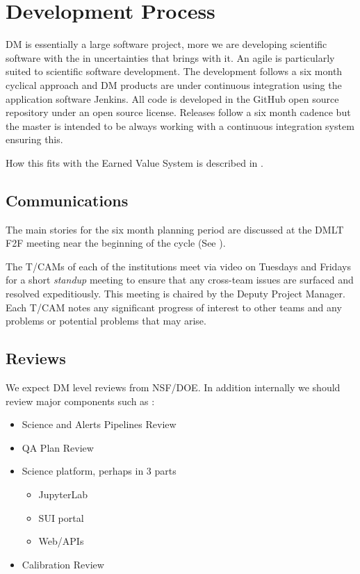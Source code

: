 \section{Development Process} \label{sect:devproc}

DM is essentially a large software project, more we are developing scientific software with the in uncertainties that brings with it. 
An agile \citep{it:agile} is particularly suited to scientific software development.  The development follows a six month  cyclical approach and  DM  products are under continuous
integration using the application software Jenkins. All code is developed in the GitHub open source repository under an open source license.
Releases follow a six month cadence but the master is intended to be always working with a continuous integration system ensuring this.

How this fits with the Earned Value System is described in .


\subsection{Communications}

The main stories for the six month planning period are discussed at the DMLT F2F meeting near the beginning of the cycle (See ). 

The T/CAMs of each of the institutions meet via video on Tuesdays and Fridays for a short \emph{standup} meeting to ensure that any cross-team issues are surfaced and resolved expeditiously.
This meeting is chaired by the Deputy Project Manager.
Each T/CAM notes any significant progress of interest to other teams and any problems or potential problems that may arise.

\subsection{Reviews} \label{sect:reviews}
We expect DM level reviews from NSF/DOE. In addition internally we should review major components such as :
\begin{itemize}

\item  Science and Alerts Pipelines Review 
\item   QA Plan Review 
  \item  Science platform, perhaps in 3 parts
	\begin{itemize}
	  \item  JupyterLab 
	  \item SUI portal
	  \item Web/APIs
	\end{itemize}
  \item  Calibration Review 

\end{itemize}

